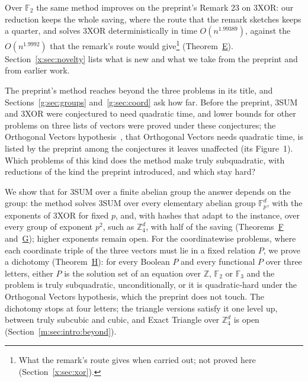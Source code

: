 \documentclass[11pt]{article}
\theoremstyle{definition}
\theoremstyle{remark}
\newcommand{\Z}{\mathbb{Z}}
\newcommand{\F}{\mathbb{F}_2}
\newcommand{\Fp}{\mathbb{F}_p}
\newcommand{\ExpBestUp}{1.99389}%
\begin{document}
Over $\mathbb F_2$ the same method improves on the preprint's Remark 23 on 3XOR: our reduction keeps the whole saving, where the route that the remark sketches keeps a quarter, and solves 3XOR deterministically in time $O(n^{\ExpBestUp})$, against the $O(n^{1.9992})$ that the remark's route would give\footnote{What the remark's route gives when carried out; not proved here (Section~\ref{x:sec:xor}).} (Theorem~\hyperref[m:introE]{E}). Section~\ref{x:sec:novelty} lists what is new and what we take from the preprint and from earlier work.

The preprint's method reaches beyond the three problems in its title, and Sections~\ref{g:sec:groups} and~\ref{g:sec:coord} ask how far. Before the preprint, 3SUM and 3XOR were conjectured to need quadratic time, and lower bounds for other problems on three lists of vectors were proved under these conjectures; %
the Orthogonal Vectors hypothesis~\cite{Wil05}, that Orthogonal Vectors needs quadratic time, is listed by the preprint among the conjectures it leaves unaffected (its Figure~1). Which problems of this kind does the method make truly subquadratic, with reductions of the kind the preprint introduced, and which stay hard?

We show that for 3SUM over a finite abelian group the answer depends on the group: the method solves 3SUM over every elementary abelian group $\Fp^d$, with the exponents of 3XOR for fixed $p$, and, with hashes that adapt to the instance, over every group of exponent $p^2$, such as $\Z_4^d$, with half of the saving (Theorems~\hyperref[m:introF]{F} and~\hyperref[m:introG]{G}); higher exponents remain open. For the coordinatewise problems, where each coordinate triple of the three vectors must lie in a fixed relation $P$, we prove a dichotomy (Theorem~\hyperref[m:introH]{H}): for every Boolean $P$ and every functional $P$ over three letters, either $P$ is the solution set of an equation over $\Z$, $\F$ or $\mathbb F_3$ and the problem is truly subquadratic, unconditionally, or it is quadratic-hard under the Orthogonal Vectors hypothesis, which the preprint does not touch. The dichotomy stops at four letters; the triangle versions satisfy it one level up, between truly subcubic and cubic, and Exact Triangle over $\Z_4^d$ is open (Section~\ref{m:sec:intro:beyond}).
\end{document}
